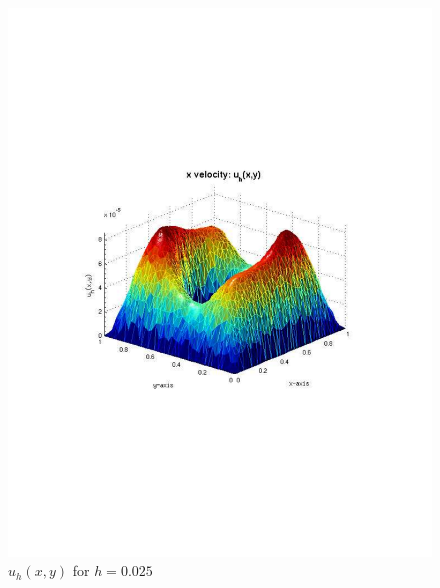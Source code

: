 \documentclass[12pt]{article}
\begin{document}
                \begin{figure}[htb]
                    \begin{center}
                \includegraphics[scale=0.50]{./../files/box-circle/u.pdf}
                \caption{$u_h(x,y)$ for $h = 0.025$}
            \end{center}
            \end{figure}
\end{document}
